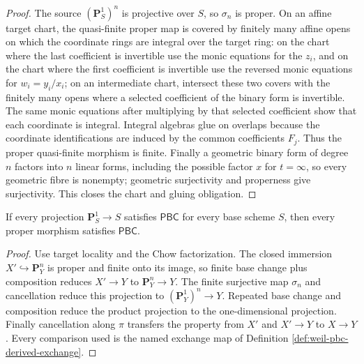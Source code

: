 \begin{proof}
The source $(\mathbf P^1_S)^n$ is projective over $S$, so $\sigma_n$ is
proper.  On an affine target chart, the quasi-finite proper map is covered by
finitely many affine opens on which the coordinate rings are integral over the
target ring: on the chart where the last coefficient is invertible use the
monic equations for the $z_i$, and on the chart where the first coefficient
is invertible use the reversed monic equations for $w_i=y_i/x_i$; on an
intermediate chart, intersect these two covers with the finitely many opens
where a selected coefficient of the binary form is invertible.  The same
monic equations after multiplying by that selected coefficient show that each
coordinate is integral.  Integral algebras glue on overlaps because the
coordinate identifications are induced by the common coefficients $F_j$.
Thus the proper quasi-finite morphism is finite.  Finally a geometric binary
form of degree $n$ factors into $n$ linear forms, including the possible
factor $x$ for $t=\infty$, so every geometric fibre is nonempty; geometric
surjectivity and properness give surjectivity.  This closes the chart and
gluing obligation.
\end{proof}

\begin{proposition}
\label{prop:weil-pbc-reduction-to-projective-line}

If every projection $\mathbf P^1_S\to S$ satisfies $\mathsf{PBC}$ for every
base scheme $S$, then every proper morphism satisfies $\mathsf{PBC}$.
\end{proposition}
\begin{proof}

Use target locality and the Chow factorization.  The closed immersion
$X'\hookrightarrow\mathbf P^n_Y$ is proper and finite onto its image, so
finite base change plus composition reduces $X'\to Y$ to
$\mathbf P^n_Y\to Y$.  The finite surjective map $\sigma_n$ and cancellation
reduce this projection to $(\mathbf P^1_Y)^n\to Y$.  Repeated base change and
composition reduce the product projection to the one-dimensional projection.
Finally cancellation along $\pi$ transfers the property from $X'$ and
$X'\to Y$ to $X\to Y$.  Every comparison used is the named exchange map of
Definition \ref{def:weil-pbc-derived-exchange}.
\end{proof}

